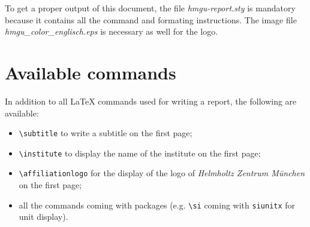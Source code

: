 \documentclass[a4paper,12pt,oneside]{report}
\begin{document}
			To get a proper output of this document, the file \textit{hmgu-report.sty} is mandatory because it contains all the command and formating instructions. The image file \textit{hmgu\_color\_englisch.eps} is necessary as well for the logo.
	
	\chapter{Available commands}
		In addition to all \LaTeX{} commands used for writing a report, the following are available:
		\begin{itemize}
			\item \verb|\subtitle| to write a subtitle on the first page;
			\item \verb|\institute| to display the name of the institute on the first page;
			\item \verb|\affiliationlogo| for the display of the logo of \emph{Helmholtz Zentrum München} on the first page;
			\item all the commands coming with packages (e.g. \verb|\si| coming with \texttt{siunitx} for unit display).
		\end{itemize}
\end{document}
